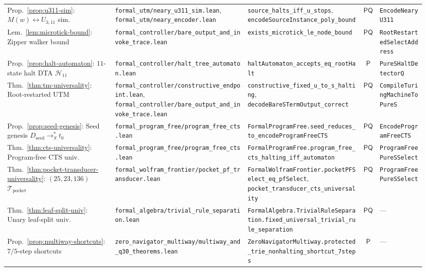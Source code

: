 \documentclass[11pt,reqno]{amsart}
\numberwithin{equation}{section}
\theoremstyle{plain}
\theoremstyle{definition}
\theoremstyle{remark}
\begin{document}
\begin{table}[htbp]
\begin{tabular}{@{}lllcl@{}}
Prop.~\ref{prop:u311-sim}: $M(w) \leftrightarrow U_{3,11}$ sim. & \texttt{formal\_utm/neary\_u311\_sim.lean}, \texttt{formal\_utm/neary\_encoder.lean} & \texttt{source\_halts\_iff\_u\_stops}, \texttt{encodeSourceInstance\_poly\_bound} & $\mathsf{PQ}$ & \texttt{EncodeNearyU311} \\
Lem.~\ref{lem:microtick-bound}: Zipper walker bound & \texttt{formal\_controller/bare\_output\_and\_invoke\_trace.lean} & \texttt{exists\_microtick\_le\_node\_bound} & $\mathsf{PQ}$ & \texttt{RootRestartedSelectAddress} \\
Prop.~\ref{prop:halt-automaton}: $11$-state halt DTA $\mathcal{H}_{11}$ & \texttt{formal\_controller/halt\_tree\_automaton.lean} & \texttt{haltAutomaton\_accepts\_eq\_rootHalt} & $\mathsf{P}$ & \texttt{PureSHaltDetectorQ} \\
Thm.~\ref{thm:tm-universality}: Root-restarted UTM & \texttt{formal\_controller/constructive\_endpoint.lean}, \texttt{formal\_controller/bare\_output\_and\_invoke\_trace.lean} & \texttt{constructive\_fixed\_u\_to\_s\_halting}, \texttt{decodeBareSTermOutput\_correct} & $\mathsf{PQ}$ & \texttt{CompileTuringMachineToPureS} \\
Prop.~\ref{prop:seed-genesis}: Seed genesis $D_{\mathrm{seed}} \to_S^* t_0$ & \texttt{formal\_program\_free/program\_free\_cts.lean} & \texttt{FormalProgramFree.seed\_reduces\_to\_encodeProgramFreeCTS} & $\mathsf{PQ}$ & \texttt{EncodeProgramFreeCTS} \\
Thm.~\ref{thm:cts-universality}: Program-free CTS univ. & \texttt{formal\_program\_free/program\_free\_cts.lean} & \texttt{FormalProgramFree.program\_free\_cts\_halting\_iff\_automaton} & $\mathsf{PQ}$ & \texttt{ProgramFreePureSSelect} \\
Thm.~\ref{thm:pocket-transducer-universality}: $(25,23,136)$ $\mathcal{T}_{\mathrm{pocket}}$ & \texttt{formal\_wolfram\_frontier/pocket\_pf\_transducer.lean} & \texttt{FormalWolframFrontier.pocketPFSelect\_eq\_pfSelect}, \texttt{pocket\_transducer\_cts\_universality} & $\mathsf{PQ}$ & \texttt{ProgramFreePureSSelect} \\
Thm.~\ref{thm:leaf-split-univ}: Unary leaf-split univ. & \texttt{formal\_algebra/trivial\_rule\_separation.lean} & \texttt{FormalAlgebra.TrivialRuleSeparation.fixed\_universal\_trivial\_rule\_separation} & $\mathsf{PQ}$ & --- \\
Prop.~\ref{prop:multiway-shortcuts}: $7$/$5$-step shortcuts & \texttt{zero\_navigator\_multiway/multiway\_and\_q30\_theorems.lean} & \texttt{ZeroNavigatorMultiway.protected\_trie\_nonhalting\_shortcut\_7steps} & $\mathsf{P}$ & --- \\

\end{tabular}
\end{table}
\end{document}
